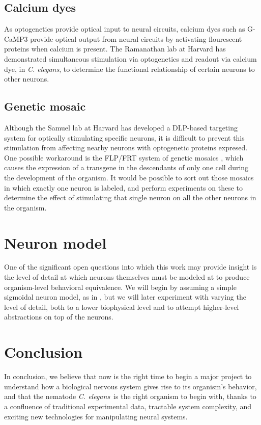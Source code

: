 \documentclass[letter,11pt]{article}
\newcommand{\cel}{{\em C. elegans}}
\begin{document}
\subsection{Calcium dyes}

As optogenetics provide optical input to neural circuits, calcium dyes such as
G-CaMP3 provide optical output from neural circuits by activating flourescent
proteins when calcium is present. The Ramanathan lab at Harvard has
demonstrated \cite{ramanathan} simultaneous stimulation via optogenetics and
readout via calcium dye, in \cel, to determine the functional relationship of
certain neurons to other neurons.

\subsection{Genetic mosaic}

Although the Samuel lab at Harvard has developed \cite{leifer} a DLP-based
targeting system for optically stimulating specific neurons, it is difficult
to prevent this stimulation from affecting nearby neurons with optogenetic
proteins expresed.  One possible workaround is the FLP/FRT system of genetic
mosaics \cite{mosaic}, which causes the expression of a transgene in the
descendants of only one cell during the development of the organism. It would
be possible to sort out those mosaics in which exactly one neuron is labeled,
and perform experiments on these to determine the effect of stimulating that
single neuron on all the other neurons in the organism.

\section{Neuron model}

One of the significant open questions into which this work may provide insight
is the level of detail at which neurons themselves must be modeled at to
produce organism-level behavioral equivalence. We will begin by assuming a
simple sigmoidal neuron model, as in \cite{ohtake}, but we will later
experiment with varying the level of detail, both to a lower biophysical level
and to attempt higher-level abstractions on top of the neurons.

\section{Conclusion}

In conclusion, we believe that now is the right time to begin a major project
to understand how a biological nervous system gives rise to its organism's
behavior, and that the nematode \cel\ is the right organism to begin with,
thanks to a confluence of traditional experimental data, tractable system
complexity, and exciting new technologies for manipulating neural systems.

{}
\nocite{*}


\end{document}
